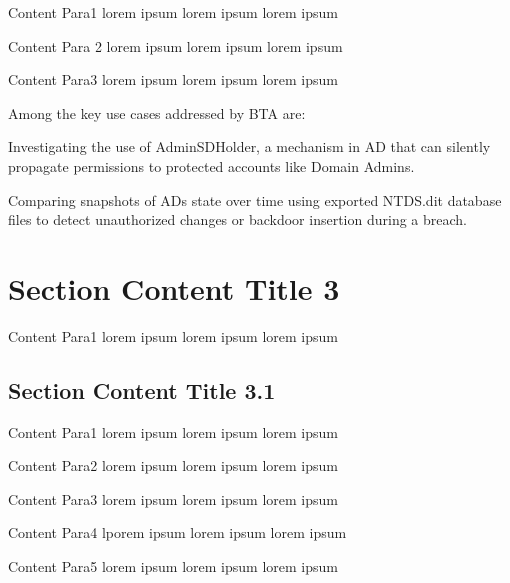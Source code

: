 Content Para1 lorem ipsum lorem ipsum lorem ipsum

Content Para 2 lorem ipsum lorem ipsum lorem ipsum

Content Para3 lorem ipsum lorem ipsum lorem ipsum


Among the key use cases addressed by BTA are:
    \item Investigating the use of AdminSDHolder, a mechanism in AD that can silently propagate permissions to protected accounts like Domain Admins.
    \item Comparing snapshots of ADs state over time using exported NTDS.dit database files to detect unauthorized changes or backdoor insertion during a breach.

\section{Section Content Title 3}
\label{sec:3}

Content Para1 lorem ipsum lorem ipsum lorem ipsum

\subsection{Section Content Title 3.1}
\label{sec:3.1}

Content Para1 lorem ipsum lorem ipsum lorem ipsum

Content Para2 lorem ipsum lorem ipsum lorem ipsum

Content Para3 lorem ipsum lorem ipsum lorem ipsum

Content Para4 lporem ipsum lorem ipsum lorem ipsum

Content Para5 lorem ipsum lorem ipsum lorem ipsum


